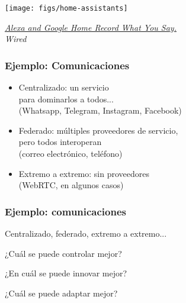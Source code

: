 \documentclass[17pt,aspectratio=169]{beamer}
\begin{document}
\begin{frame}[fragile]

  \begin{center}
  \texttt{[image: figs/home-assistants]}
  \end{center}

  \begin{flushright}
    {\em
      \href{https://www.wired.com/2016/12/alexa-and-google-record-your-voice/}{Alexa and Google Home Record What You Say.} \\
      Wired \\
      }
  \end{flushright}
  
\end{frame}



\begin{frame}
\frametitle{Ejemplo: Comunicaciones}

  \begin{itemize}
  \item Centralizado: un servicio \\
    para dominarlos a todos... \\
    (Whatsapp, Telegram, Instagram, Facebook)
  \item Federado: múltiples proveedores de servicio, \\
    pero todos interoperan \\
    (correo electrónico, teléfono)
  \item Extremo a extremo: sin proveedores \\
    (WebRTC, en algunos casos)
  \end{itemize}
\end{frame}


\begin{frame}
\frametitle{Ejemplo: comunicaciones}


Centralizado, federado, extremo a extremo...

\begin{flushright}
  {\Large
    ¿Cuál se puede controlar mejor? \\

    \vspace{.5cm}
    
    ¿En cuál se puede innovar mejor? \\

    \vspace{.5cm}

    ¿Cuál se puede adaptar mejor? \\
  }
    \end{flushright}

\end{frame}
\end{document}
